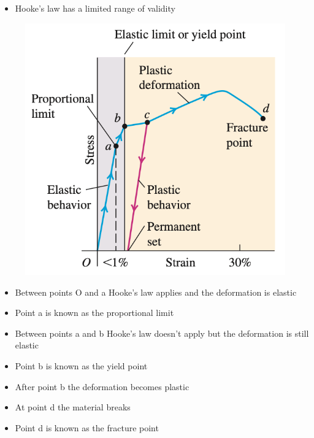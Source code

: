 \documentclass{article}
\begin{document}
\begin{itemize}
    \item Hooke's law has a limited range of validity
\end{itemize}

\begin{figure}[H]
    \centering
    \includegraphics[scale=0.5]{stress-strain}
\end{figure}

\begin{itemize}
    \item Between points O and a Hooke's law applies and the deformation is elastic

    \item Point a is known as the proportional limit

    \item Between points a and b Hooke's law doesn't apply but the deformation is still elastic

    \item Point b is known as the yield point

    \item After point b the deformation becomes plastic

    \item At point d the material breaks

    \item Point d is known as the fracture point
\end{itemize}
\end{document}

